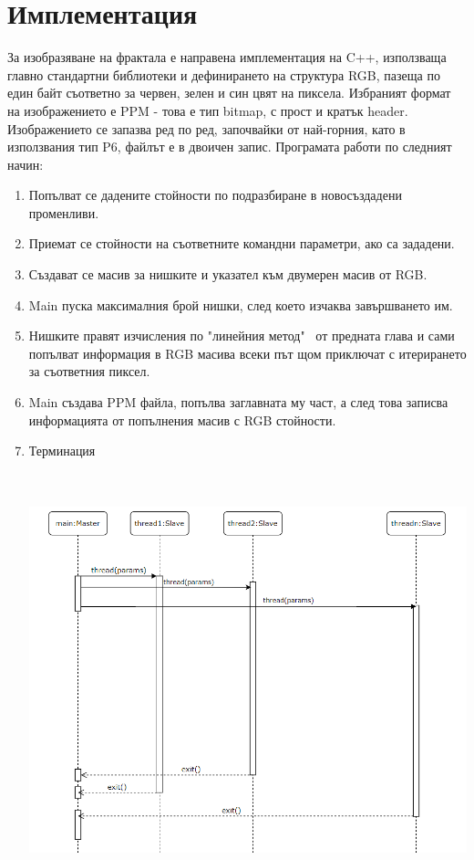 \section{Имплементация}
\begin{Large}
За изобразяване на фрактала е направена имплементация на C++, използваща главно стандартни библиотеки и дефинирането на структура RGB, пазеща по един байт съответно за червен, зелен и син цвят на пиксела. Избраният формат на изображението е PPM - това е тип bitmap, с прост и кратък header. Изображението се запазва ред по ред, започвайки от най-горния, като в използвания тип P6, файлът е в двоичен запис. Програмата работи по следният начин:
 \begin{enumerate}
\item Попълват се дадените стойности по подразбиране в новосъздадени променливи.
\item Приемат се стойности на съответните командни параметри, ако са зададени.
\item Създават се масив за нишките и указател към двумерен масив от RGB.
\item Main пуска максималния брой нишки, след което изчаква завършването им.
\item Нишките правят изчисления по "линейния метод" \ от предната глава и сами попълват информация в RGB масива всеки път щом приключат с итерирането за съответния пиксел.
\item Main създава PPM файла, попълва заглавната му част, а след това записва информацията от попълнения масив с RGB стойности.
\item Терминация 
 
 \includegraphics[width=14cm,height=12cm]{SequenceDiagram}
 

\end{enumerate}
\end{Large}
